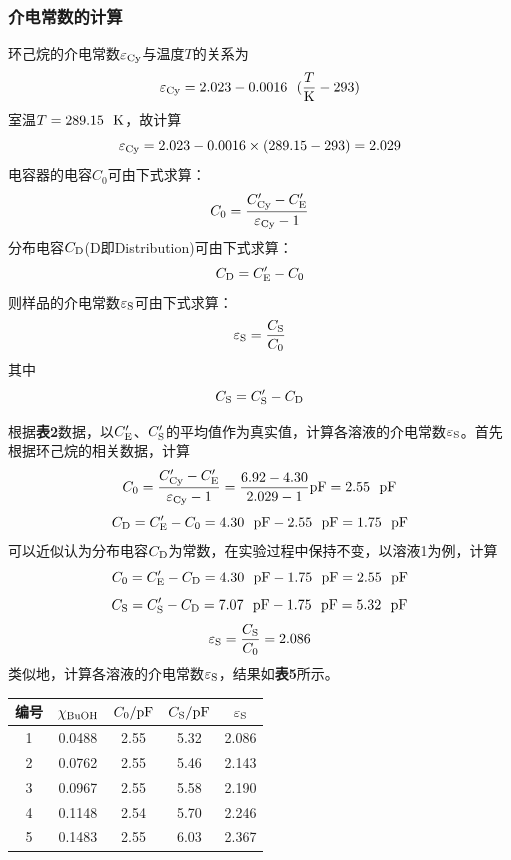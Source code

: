 \documentclass[12pt]{article}
\begin{document}
 \subsubsection{介电常数的计算}
环己烷的介电常数$\varepsilon_{\rm Cy}$与温度$T$的关系为
$$
\varepsilon_{\rm Cy}=2.023-0.0016\ \ (\frac{T}{\rm K}-293)
$$
室温$T=289.15\ \ {\rm K}$，故计算
$$
\varepsilon_{\rm Cy}=2.023-0.0016\times (289.15-293)=2.029
$$
电容器的电容$C_{0}$可由下式求算：
$$
C_{0}=\frac{C^{\prime}_{\rm Cy}-C^{\prime}_{\rm E}}{\varepsilon_{\rm Cy}-1}
$$
分布电容$C_{\rm D}$(D即Distribution)可由下式求算：
$$
C_{\rm D}=C^{\prime}_{\rm E}-C_{0}
$$
则样品的介电常数$\varepsilon_{\rm S}$可由下式求算：
$$
\varepsilon_{\rm S}=\frac{C_{\rm S}}{C_{0}}
$$
其中
$$
C_{\rm S}=C^{\prime}_{\rm S}-C_{\rm D}
$$
\par 
根据\textbf{表2}数据，以$C^{\prime}_{\rm E}$、$C^{\prime}_{\rm S}$的平均值作为真实值，计算各溶液的介电常数$\varepsilon_{\rm S}$。首先根据环己烷的相关数据，计算
$$
C_{0}=\frac{C^{\prime}_{\rm Cy}-C^{\prime}_{\rm E}}{\varepsilon_{\rm Cy}-1}=\frac{6.92-4.30}{2.029-1}{\rm pF}=2.55\ \ {\rm pF}
$$
$$
C_{\rm D}=C^{\prime}_{\rm E}-C_{0}=4.30\ \ {\rm pF}-2.55\ \ {\rm pF}=1.75\ \ {\rm pF}
$$
可以近似认为分布电容$C_{\rm D}$为常数，在实验过程中保持不变，以溶液1为例，计算
$$
C_{0}=C^{\prime}_{\rm E}-C_{\rm D}=4.30\ \ {\rm pF}-1.75\ \ {\rm pF}=2.55\ \ {\rm pF}
$$
$$
C_{\rm S}=C^{\prime}_{\rm S}-C_{\rm D}=7.07\ \ {\rm pF}-1.75\ \ {\rm pF}=5.32\ \ {\rm pF}
$$
$$
\varepsilon_{\rm S}=\frac{C_{\rm S}}{C_{0}}=2.086
$$
类似地，计算各溶液的介电常数$\varepsilon_{\rm S}$，结果如\textbf{表5}所示。
\begin{table}[h]
	\centering
	\begin{tabular}{ccccc}
		\toprule
		编号 & $\chi_{\rm BuOH}$ & $C_{0}/{\rm pF}$ & $C_{\rm S}/{\rm pF}$ & $\varepsilon_{\rm S}$ \\
		\midrule
		1 & 0.0488 & 2.55 & 5.32 & 2.086 \\
		2 & 0.0762 & 2.55 & 5.46 & 2.143 \\
		3 & 0.0967 & 2.55 & 5.58 & 2.190 \\
		4 & 0.1148 & 2.54 & 5.70 & 2.246 \\
		5 & 0.1483 & 2.55 & 6.03 & 2.367 \\
		\bottomrule
	\end{tabular}
\end{table}
\par
\end{document}
